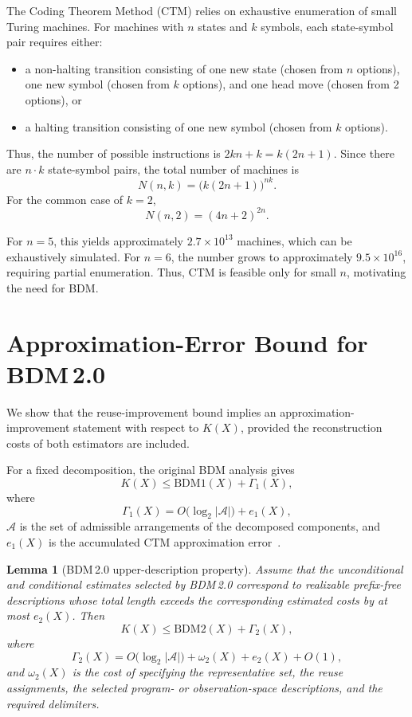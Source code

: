 \documentclass{article}
\newtheorem{lemma}{Lemma}
\begin{document}
The Coding Theorem Method (CTM) relies on exhaustive enumeration of small Turing machines. For machines with \(n\) states and \(k\) symbols, each state-symbol pair requires either:
\begin{itemize}
\item a non-halting transition consisting of one new state (chosen from \(n\) options), one new symbol (chosen from \(k\) options), and one head move (chosen from 2 options), or
\item a halting transition consisting of one new symbol (chosen from \(k\) options).
\end{itemize}

Thus, the number of possible instructions is \(2kn+k=k(2n+1)\). Since there are \(n\cdot k\) state-symbol pairs, the total number of machines is
\[
N(n,k)
=
\bigl(k(2n+1)\bigr)^{nk}.
\]
For the common case of \(k=2\),
\[
N(n,2)
=
(4n+2)^{2n}.
\]

For \(n=5\), this yields approximately \(2.7\times 10^{13}\) machines, which can be exhaustively simulated. For \(n=6\), the number grows to approximately \(9.5\times 10^{16}\), requiring partial enumeration. Thus, CTM is feasible only for small \(n\), motivating the need for BDM.

\section[Approximation-Error Bound for BDM 2.0]{Approximation-Error Bound for BDM\,2.0}
\label{app:bdm2-approximation-error}

We show that the reuse-improvement bound implies an approximation-improvement statement with respect to \(K(X)\), provided the reconstruction costs of both estimators are included.

For a fixed decomposition, the original BDM analysis gives
\[
K(X)
\leq
\mathrm{BDM1}(X)+\Gamma_1(X),
\]
where
\[
\Gamma_1(X)
=
O\bigl(\log_2|\mathcal A|\bigr)+e_1(X),
\]
\(\mathcal A\) is the set of admissible arrangements of the decomposed components, and \(e_1(X)\) is the accumulated CTM approximation error~\cite{zenil_decomposition_2018}.

\begin{lemma}[BDM\,2.0 upper-description property]
\label{lem:bdm2-upper-description}
Assume that the unconditional and conditional estimates selected by BDM\,2.0 correspond to realizable prefix-free descriptions whose total length exceeds the corresponding estimated costs by at most \(e_2(X)\). Then
\[
K(X)
\leq
\mathrm{BDM2}(X)+\Gamma_2(X),
\]
where
\[
\Gamma_2(X)
=
O\bigl(\log_2|\mathcal A|\bigr)
+
\omega_2(X)
+
e_2(X)
+
O(1),
\]
and \(\omega_2(X)\) is the cost of specifying the representative set, the reuse assignments, the selected program- or observation-space descriptions, and the required delimiters.
\end{lemma}
\end{document}
